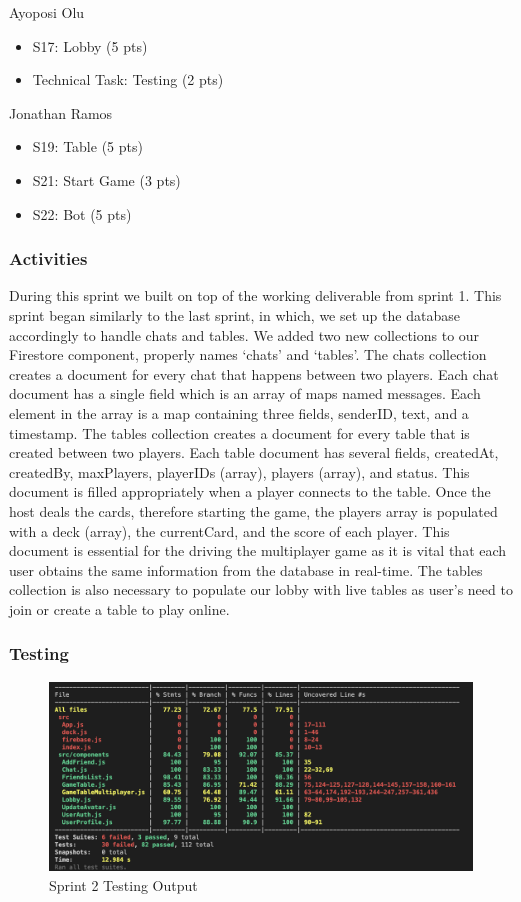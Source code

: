 Ayoposi Olu

\begin{itemize}
    \item S17: Lobby (5 pts)
    \item Technical Task: Testing (2 pts)
\end{itemize}


Jonathan Ramos

\begin{itemize}
    \item S19: Table (5 pts)
    \item S21: Start Game (3 pts)
    \item S22: Bot (5 pts)
\end{itemize}

\subsubsection{Activities}
During this sprint we built on top of the working deliverable from sprint 1. This sprint began similarly to the last sprint, in which, we set up the database accordingly to handle chats and tables. We added two new collections to our Firestore component, properly names `chats' and `tables'. The chats collection creates a document for every chat that happens between two players. Each chat document has a single field which is an array of maps named messages. Each element in the array is a map containing three fields, senderID, text, and a timestamp. The tables collection creates a document for every table that is created between two players. Each table document has several fields, createdAt, createdBy, maxPlayers, playerIDs (array), players (array), and status. This document is filled appropriately when a player connects to the table. Once the host deals the cards, therefore starting the game, the players array is populated with a deck (array), the currentCard, and the score of each player. This document is essential for the driving the multiplayer game as it is vital that each user obtains the same information from the database in real-time. The tables collection is also necessary to populate our lobby with live tables as user's need to join or create a table to play online. 


\subsubsection {Testing}
\begin{figure}[h]
    \centering
    \includegraphics[width=1\linewidth]{figures/Testing.png}
    \caption{Sprint 2 Testing Output}
    \label{fig:enter-label}
\end{figure}

